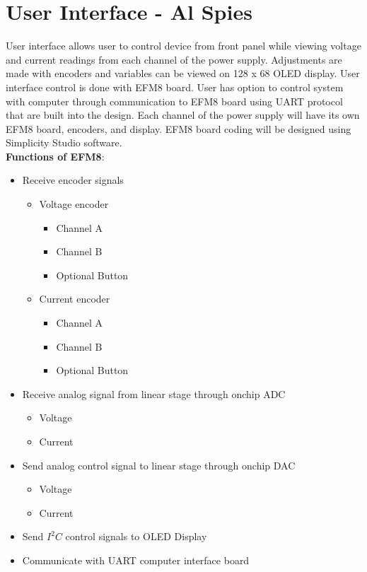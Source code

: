 \documentclass[12pt]{article}
\begin{document}
\section{User Interface - Al Spies}
User interface allows user to control device from front panel while viewing voltage and current readings from each channel of the power supply. Adjustments are made with encoders and variables can be viewed on 128 x 68 OLED display. User interface control is done with EFM8 board. User has option to control system with computer through communication to EFM8 board using UART protocol that are built into the design. Each channel of the power supply will have its own EFM8 board, encoders, and display. EFM8 board coding will be designed using Simplicity Studio software.\\

\noindent \textbf{Functions of EFM8}:
\begin{itemize}
    \item Receive encoder signals \begin{itemize}
        \item Voltage encoder  \begin{itemize}
            \item Channel A
            \item Channel B
            \item Optional Button
        \end{itemize}
        \item Current encoder  \begin{itemize}
            \item Channel A
            \item Channel B
            \item Optional Button
        \end{itemize}
    \end{itemize}
    \item Receive analog signal from linear stage through onchip ADC \begin{itemize}
        \item Voltage
        \item Current
    \end{itemize}
    \item Send analog control signal to linear stage through onchip DAC \begin{itemize}
        \item Voltage
        \item Current
    \end{itemize}
    \item Send $I^2C$ control signals to OLED Display
    \item Communicate with UART computer interface board
\end{itemize}
\pagebreak
\end{document}
